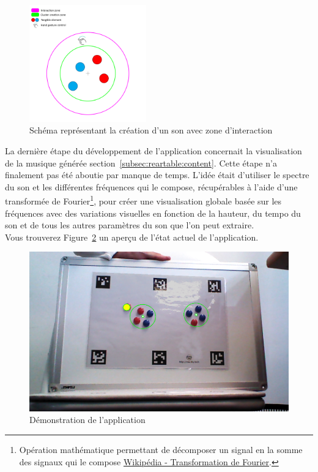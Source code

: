 \begin{figure}[H]
\centering
\includegraphics[width=0.45\textwidth]{images/reartable_cluster_interaction}
\caption{Schéma représentant la création d'un son avec zone d'interaction}
\label{fig:reartable:interactionzone}
\end{figure}

La dernière étape du développement de l'application concernait la visualisation de la musique générée section~\ref{subsec:reartable:content}. Cette étape n'a finalement pas été aboutie par manque de temps. L'idée était d'utiliser le spectre du son et les différentes fréquences qui le compose, récupérables à l'aide d'une transformée de Fourier\footnote{Opération mathématique permettant de décomposer un signal en la somme des signaux qui le compose \href{https://fr.wikipedia.org/wiki/Transformation_de_Fourier}{Wikipédia - Transformation de Fourier}.}, pour créer une visualisation globale basée sur les fréquences avec des variations visuelles en fonction de la hauteur, du tempo du son et de tous les autres paramètres du son que l'on peut extraire.\\

Vous trouverez Figure~\ref{fig:reartable:demo} un aperçu de l'état actuel de l'application. 

\begin{figure}[H]
\centering
\includegraphics[width=0.65\linewidth]{images/reartable}
\caption{Démonstration de l'application}
\label{fig:reartable:demo}
\end{figure}

